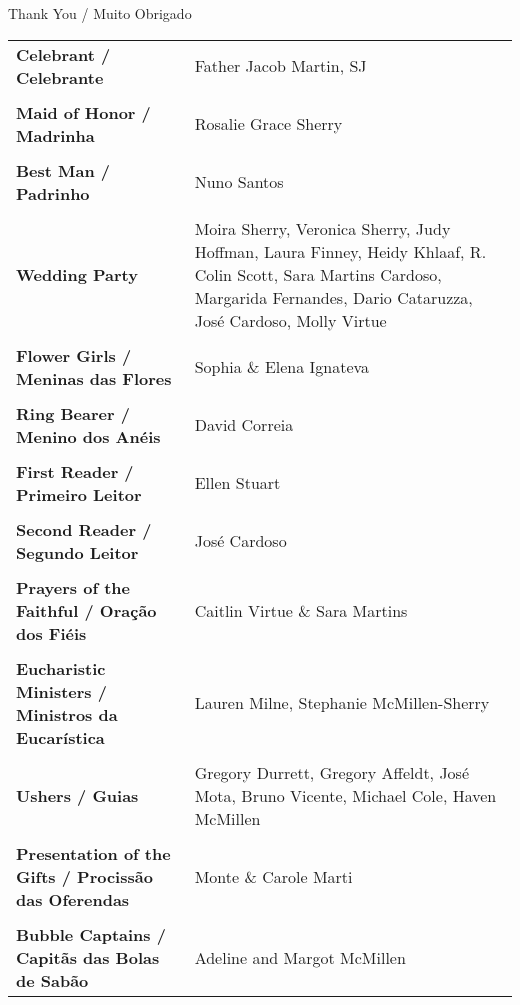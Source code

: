 \centering
{\Large Thank You / Muito Obrigado}

\vspace{10pt}

\small

\setlength\extrarowheight{-1pt} 
\begin{longtable}{p{2in}p{2in}}
{\bf Celebrant / Celebrante} & Father Jacob Martin, SJ\\
\\

{\bf Maid of Honor / Madrinha} & Rosalie Grace Sherry\\
\\

{\bf Best Man / Padrinho} & Nuno Santos\\
\\

{\bf Wedding Party} & Moira Sherry, Veronica Sherry, Judy Hoffman, Laura Finney, Heidy Khlaaf, R. Colin Scott, Sara Martins Cardoso, Margarida Fernandes, Dario Cataruzza, José Cardoso, Molly Virtue\\
\\

{\bf Flower Girls / Meninas das Flores} & Sophia \& Elena Ignateva\\
\\

{\bf Ring Bearer / Menino dos Anéis} & David Correia\\
\\

{\bf First Reader / Primeiro Leitor} & Ellen Stuart\\
\\

{\bf Second Reader / Segundo Leitor} & José Cardoso \\
\\

{\bf Prayers of the Faithful /  Oração dos Fiéis} & Caitlin Virtue \& Sara Martins \\
\\

{\bf Eucharistic Ministers / Ministros da Eucarística} & Lauren Milne, Stephanie McMillen-Sherry\\
\\

{\bf Ushers / Guias} & Gregory Durrett, Gregory Affeldt, José Mota, Bruno Vicente, Michael Cole, Haven McMillen\\
\\

{\bf Presentation of the Gifts / Procissão das Oferendas} & Monte \& Carole Marti\\
\\

{\bf Bubble Captains / Capitãs das Bolas de Sabão} & Adeline and Margot McMillen\\

\end{longtable}

